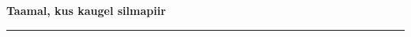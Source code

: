 \documentclass[10pt]{book}
\begin{document}
{
  \samepage
  \raggedbottom
  \raggedright
  \sloppy


  \vspace{0.2in}

  \noindent\begin{minipage}{.1\textwidth}
    \hfill\vspace{0.1in}
  \end{minipage}%
  \noindent\begin{minipage}{.8\textwidth}
    \centering
    \bfseries
    \large Taamal, kus kaugel silmapiir
  \end{minipage}%
  \noindent\begin{minipage}{.1\textwidth}
      \hfill\vspace{0.1in}
  \end{minipage}

  \nopagebreak[4]
  \vspace{0.1in}
  \nopagebreak[4]
  \hrule height 0.05ex
  \nopagebreak[4]
  \vspace{-0.05in}




}
\end{document}
